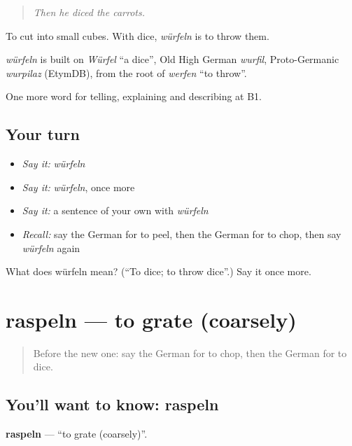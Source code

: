 \begin{quote}
\emph{Then he diced the carrots.}
\end{quote}

To cut into small cubes. With dice, \emph{würfeln} is to throw them.

\begin{cousinweb}
\emph{würfeln} is built on \emph{Würfel} \textquotedblleft{}a dice\textquotedblright{}, Old High German \emph{wurfil}, Proto-Germanic \emph{wurpilaz} (EtymDB), from the root of \emph{werfen} \textquotedblleft{}to throw\textquotedblright{}.
\end{cousinweb}

\begin{grammarlens}[title={What you've built}]
One more word for telling, explaining and describing at B1.
\end{grammarlens}

\subsection*{Your turn}
\begin{itemize}
\raggedright
  \item \emph{Say it:} \emph{würfeln}
  \item \emph{Say it:} \emph{würfeln}, once more
  \item \emph{Say it:} a sentence of your own with \emph{würfeln}
  \item \emph{Recall:} say the German for to peel, then the German for to chop, then say \emph{würfeln} again
\end{itemize}

\begin{tcolorbox}[breakable,colback=teal!4,colframe=teal!35!black,title={Before you move on}]
What does würfeln mean? (\textquotedblleft{}To dice; to throw dice\textquotedblright{}.) Say it once more.
\end{tcolorbox}
\section[raspeln]{raspeln — to grate (coarsely)}

\label{lesson:GE-C323-raspeln}



\begin{quote}
Before the new one: say the German for to chop, then the German for to dice.
\end{quote}

\subsection*{You'll want to know: raspeln}
\textbf{raspeln} — \textquotedblleft{}to grate (coarsely)\textquotedblright{}.


